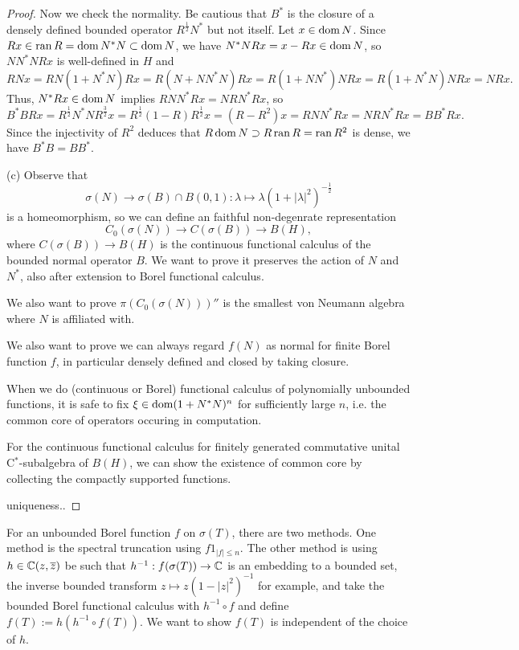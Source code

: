 \documentclass{../../large}
\begin{document}
\begin{proof}
Now we check the normality.
Be cautious that $B^*$ is the closure of a densely defined bounded operator $R^{\frac12}N^*$ but not itself.
Let $x\in\operatorname{dom} N$.
Since $Rx\in\operatorname{ran} R=\operatorname{dom} N^*N\subset\operatorname{dom} N$, we have $N^*NRx=x-Rx\in\operatorname{dom} N$, so $NN^*NRx$ is well-defined in $H$ and
\[RNx=RN(1+N^*N)Rx=R(N+NN^*N)Rx=R(1+NN^*)NRx=R(1+N^*N)NRx=NRx.\]
Thus, $N^*Rx\in\operatorname{dom} N$ implies $RNN^*Rx=NRN^*Rx$, so
\[B^*BRx=R^{\frac12}N^*NR^{\frac32}x=R^{\frac12}(1-R)R^{\frac12}x=(R-R^2)x=RNN^*Rx=NRN^*Rx=BB^*Rx.\]
Since the injectivity of $R^2$ deduces that $R\operatorname{dom} N\supset R\operatorname{ran} R=\operatorname{ran} R^2$ is dense, we have $B^*B=BB^*$.



(c)
Observe that
\[\sigma(N)\to\sigma(B)\cap B(0,1):\lambda\mapsto\lambda(1+|\lambda|^2)^{-\frac12}\]
is a homeomorphism, so we can define an faithful non-degenrate representation
\[C_0(\sigma(N))\to C(\sigma(B))\to B(H),\]
where $C(\sigma(B))\to B(H)$ is the continuous functional calculus of the bounded normal operator $B$.
We want to prove it preserves the action of $N$ and $N^*$, also after extension to Borel functional calculus.

We also want to prove $\pi(C_0(\sigma(N)))''$ is the smallest von Neumann algebra where $N$ is affiliated with.

We also want to prove we can always regard $f(N)$ as normal for finite Borel function $f$, in particular densely defined and closed by taking closure.


When we do (continuous or Borel) functional calculus of polynomially unbounded functions, it is safe to fix $\xi\in\operatorname{dom}(1+N^*N)^n$ for sufficiently large $n$, i.e. the common core of operators occuring in computation.

For the continuous functional calculus for finitely generated commutative unital C$^*$-subalgebra of $B(H)$, we can show the existence of common core by collecting the compactly supported functions.


uniqueness..


\end{proof}



\begin{prb}
For an unbounded Borel function $f$ on $\sigma(T)$, there are two methods.
One method is the spectral truncation using $f1_{|f|\le n}$.
The other method is using $h\in\mathbb{C}(z,\overline z)$ be such that $h^{-1}:f(\sigma(T))\to\mathbb{C}$ is an embedding to a bounded set, the inverse bounded transform $z\mapsto z(1-|z|^2)^{-1}$ for example, and take the bounded Borel functional calculus with $h^{-1}\circ f$ and define $f(T):=h(h^{-1}\circ f(T))$.
We want to show $f(T)$ is independent of the choice of $h$.
\begin{parts}
\item 
\end{parts}
\end{prb}
\end{document}
